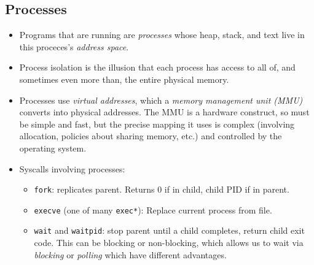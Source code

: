 \documentclass[12pt]{article}
\begin{document}
\subsection{Processes}
\begin{itemize}
	\item Programs that are running are \textit{processes} whose heap, stack, and text live in this proceces's \textit{address space}.
	\item Process isolation is the illusion that each process has access to all of, and sometimes even more than, the entire physical memory. 
	\item Processes use \textit{virtual addresses}, which a \textit{memory management unit (MMU)} converts into physical addresses. The MMU is a hardware construct, so must be simple and fast, but the precise mapping it uses is complex (involving allocation, policies about sharing memory, etc.) and controlled by the operating system. 
	\item Syscalls involving processes:
		\begin{itemize}
			\item \texttt{fork}: replicates parent. Returns 0 if in child, child PID if in parent. 
			\item \texttt{execve} (one of many \texttt{exec*}): Replace current process from file.
			\item \texttt{wait} and \texttt{waitpid}: stop parent until a child completes, return child exit code. This can be blocking or non-blocking, which allows us to wait via \textit{blocking} or \textit{polling} which have different advantages. 
		\end{itemize}
\end{itemize}
\end{document}
